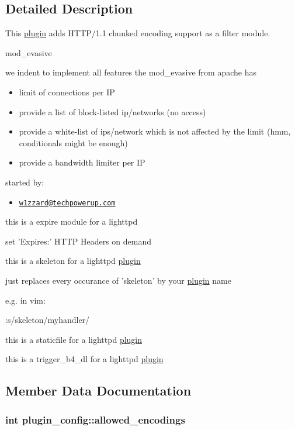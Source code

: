 \subsection{Detailed Description}
This \hyperlink{structplugin}{plugin} adds HTTP/1.1 chunked encoding support as a filter module.

mod\_\-evasive

we indent to implement all features the mod\_\-evasive from apache has

\begin{itemize}
\item limit of connections per IP\item provide a list of block-listed ip/networks (no access)\item provide a white-list of ips/network which is not affected by the limit (hmm, conditionals might be enough)\item provide a bandwidth limiter per IP\end{itemize}


started by:\begin{itemize}
\item \href{mailto:w1zzard@techpowerup.com}{\tt w1zzard@techpowerup.com}\end{itemize}


this is a expire module for a lighttpd

set 'Expires:' HTTP Headers on demand

this is a skeleton for a lighttpd \hyperlink{structplugin}{plugin}

just replaces every occurance of 'skeleton' by your \hyperlink{structplugin}{plugin} name

e.g. in vim:

:s/skeleton/myhandler/

this is a staticfile for a lighttpd \hyperlink{structplugin}{plugin}

this is a trigger\_\-b4\_\-dl for a lighttpd \hyperlink{structplugin}{plugin} 

\subsection{Member Data Documentation}
\hypertarget{structplugin__config_7a925bb5a8cf2be24c6f4db3cb3f9006}{
\subsubsection[{allowed\_\-encodings}]{\setlength{\rightskip}{0pt plus 5cm}int {\bf plugin\_\-config::allowed\_\-encodings}}}
\label{structplugin__config_7a925bb5a8cf2be24c6f4db3cb3f9006}


